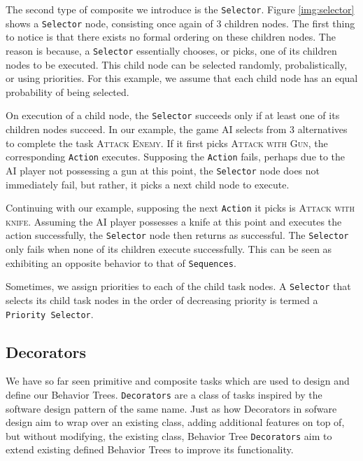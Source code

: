             The second type of composite we introduce is the \texttt{Selector}. Figure \ref{img:selector} shows a \texttt{Selector} node, consisting once again of 3 children nodes. The first thing to notice is that there exists no formal ordering on these children nodes. The reason is because, a \texttt{Selector} essentially chooses, or picks, one of its children nodes to be executed. This child node can be selected randomly, probalistically, or using priorities. For this example, we assume that each child node has an equal probability of being selected.

            On execution of a child node, the \texttt{Selector} succeeds only if at least one of its children nodes succeed. In our example, the game AI selects from 3 alternatives to complete the task \textsc{Attack Enemy}. If it first picks \textsc{Attack with Gun}, the corresponding \texttt{Action} executes. Supposing the \texttt{Action} fails, perhaps due to the AI player not possessing a gun at this point, the \texttt{Selector} node does not immediately fail, but rather, it picks a next child node to execute. 
            
            Continuing with our example, supposing the next \texttt{Action} it picks is \textsc{Attack with knife}. Assuming the AI player possesses a knife at this point and executes the action successfully, the \texttt{Selector} node then returns as successful. The \texttt{Selector} only fails when none of its children execute successfully. This can be seen as exhibiting an opposite behavior to that of \texttt{Sequences}.
            
            Sometimes, we assign priorities to each of the child task nodes. A \texttt{Selector} that selects its child task nodes in the order of decreasing priority is termed a \texttt{Priority Selector}.
            
            \subsection{Decorators}
            
            We have so far seen primitive and composite tasks which are used to design and define our Behavior Trees. \texttt{Decorators} are a class of tasks inspired by the software design pattern of the same name. Just as how Decorators in sofware design aim to wrap over an existing class, adding additional features on top of, but without modifying, the existing class, Behavior Tree \texttt{Decorators} aim to extend existing defined Behavior Trees to improve its functionality. 

